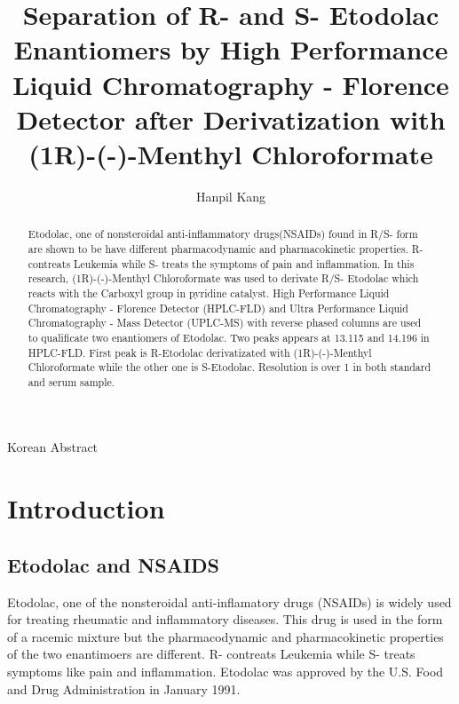 \documentclass[12pt]{article} %
\title{Separation of R- and S- Etodolac Enantiomers by High Performance Liquid Chromatography - Florence Detector after Derivatization with (1R)-(-)-Menthyl Chloroformate}
\author{Hanpil Kang}
\date{} %
\begin{document}
\setcounter{page}{1}

\maketitle

\begin{abstract}
Etodolac, one of nonsteroidal anti-inflammatory drugs(NSAIDs) found in R/S- form are shown to be have different pharmacodynamic and pharmacokinetic properties. R- contreats Leukemia while S- treats the symptoms of pain and inflammation. In this research, (1R)-(-)-Menthyl Chloroformate was used to derivate R/S- Etodolac which reacts with the Carboxyl group in pyridine catalyst. High Performance Liquid Chromatography - Florence Detector (HPLC-FLD) and Ultra Performance Liquid Chromatography - Mass Detector (UPLC-MS) with reverse phased columns are used to qualificate two enantiomers of Etodolac. Two peaks appears at 13.115 and 14.196 in HPLC-FLD. First peak is R-Etodolac derivatizated with (1R)-(-)-Menthyl Chloroformate while the other one is S-Etodolac. Resolution is over 1 in both standard and serum sample.  
\end{abstract}

\newpage

Korean Abstract

\newpage

\tableofcontents

\newpage

\listoffigures

\newpage

\listoftables

\newpage



\setcounter{page}{1}

\section{Introduction}

\subsection{Etodolac and NSAIDS}

Etodolac, one of the nonsteroidal anti-inflamatory drugs (NSAIDs) is widely used for treating rheumatic and inflammatory diseases. This drug is used in the form of a racemic mixture but the pharmacodynamic and pharmacokinetic properties of the two enantimoers are different. R- contreats Leukemia\cite{cite1} while S- treats symptoms like pain and inflammation.\cite{cadd}  Etodolac was approved by the U.S. Food and Drug Administration in January 1991.
\end{document}
